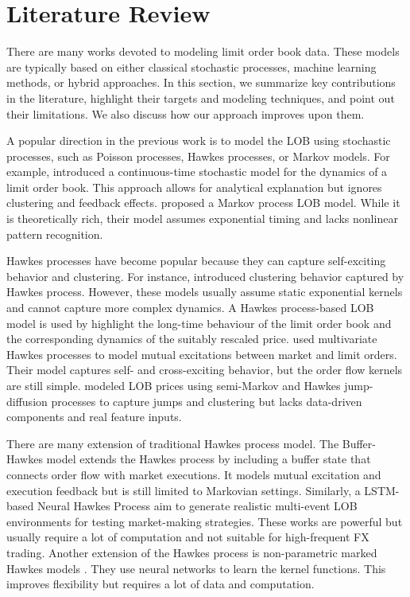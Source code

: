 \chapter{Literature Review}\label{chapter:literature}

There are many works devoted to modeling limit order book data. These models are typically based on either classical stochastic processes, machine learning methods, or hybrid approaches. In this section, we summarize key contributions in the literature, highlight their targets and modeling techniques, and point out their limitations. We also discuss how our approach improves upon them.

A popular direction in the previous work is to model the LOB using stochastic processes, such as Poisson processes, Hawkes processes, or Markov models. For example, \cite{cont_stochastic_2010} introduced a continuous-time stochastic model for the dynamics of a limit order book. This approach allows for analytical explanation but ignores clustering and feedback effects. 
\cite{bleher_orders_2021} proposed a Markov process LOB model. While it is theoretically rich, their model assumes exponential timing and lacks nonlinear pattern recognition.

Hawkes processes have become popular because they can capture self-exciting behavior and clustering. For instance, \cite{fonseca_clustering_2015} introduced clustering behavior captured by Hawkes process. However, these models usually assume static exponential kernels and cannot capture more complex dynamics. A Hawkes process-based LOB model is used by \cite{abergel_long-time_2015} highlight the long-time behaviour of the limit order book and the corresponding dynamics of the suitably rescaled price. \cite{zheng_ergodicity_2013} used multivariate Hawkes processes to model mutual excitations between market and limit orders. Their model captures self- and cross-exciting behavior, but the order flow kernels are still simple. \cite{lalor_algorithmic_2025} modeled LOB prices using semi-Markov and Hawkes jump-diffusion processes to capture jumps and clustering but lacks data-driven components and real feature inputs.

There are many extension of traditional Hawkes process model. The Buffer-Hawkes model \citep{kaj_buffer_2017} extends the Hawkes process by including a buffer state that connects order flow with market executions. It models mutual excitation and execution feedback but is still limited to Markovian settings. Similarly, a LSTM-based Neural Hawkes Process \citep{lalor_event-based_2025} aim to generate realistic multi-event LOB environments for testing market-making strategies. These works are powerful but usually require a lot of computation and not suitable for high-frequent FX trading. Another extension of the Hawkes process is non-parametric marked Hawkes models \citep{joseph_non-parametric_2024}. They use neural networks to learn the kernel functions. This improves flexibility but requires a lot of data and computation.

